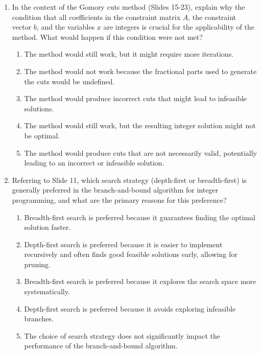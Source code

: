 \documentclass{article}%
\begin{document}
\begin{enumerate}
\begin{enumerate}
\item Subproblem 1: $x_1 = 1$; Subproblem 2: $x_1 = 2$%
\end{enumerate}%
\vspace{1em}%
\item In the context of the Gomory cuts method (Slides 15-23), explain why the condition that all coefficients in the constraint matrix $A$, the constraint vector $b$, and the variables $x$ are integers is crucial for the applicability of the method.  What would happen if this condition were not met?%
\begin{enumerate}%
\item The method would still work, but it might require more iterations.%
\item The method would not work because the fractional parts used to generate the cuts would be undefined.%
\item The method would produce incorrect cuts that might lead to infeasible solutions.%
\item The method would still work, but the resulting integer solution might not be optimal.%
\item The method would produce cuts that are not necessarily valid, potentially leading to an incorrect or infeasible solution.%
\end{enumerate}%
\vspace{1em}%
\item Referring to Slide 11, which search strategy (depth-first or breadth-first) is generally preferred in the branch-and-bound algorithm for integer programming, and what are the primary reasons for this preference?%
\begin{enumerate}%
\item Breadth-first search is preferred because it guarantees finding the optimal solution faster.%
\item Depth-first search is preferred because it is easier to implement recursively and often finds good feasible solutions early, allowing for pruning.%
\item Breadth-first search is preferred because it explores the search space more systematically.%
\item Depth-first search is preferred because it avoids exploring infeasible branches.%
\item The choice of search strategy does not significantly impact the performance of the branch-and-bound algorithm.%
\end{enumerate}%
\vspace{1em}%

\end{enumerate}
\end{document}
